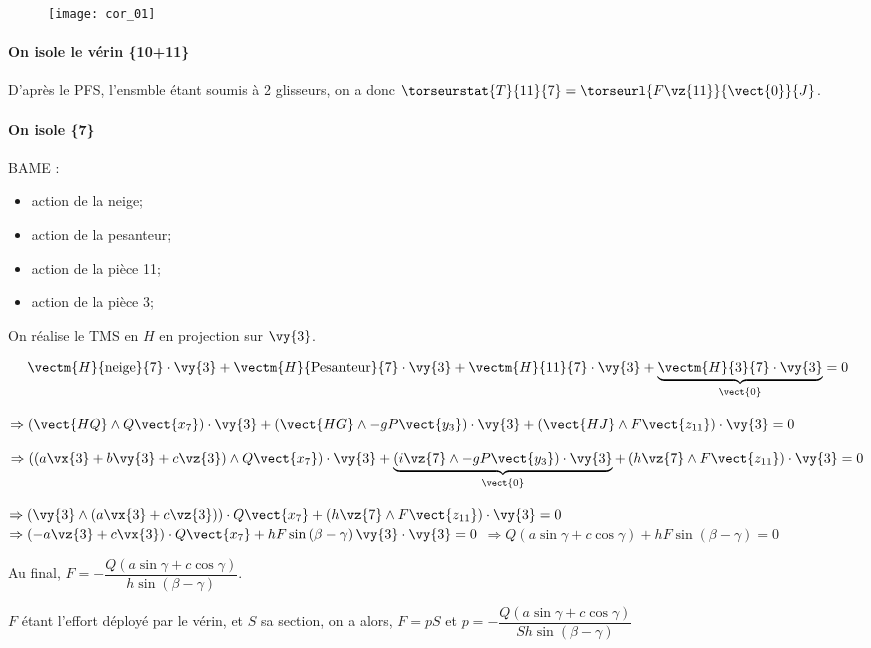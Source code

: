\begin{figure*}[!h]
\texttt{[image: cor\_01]}
\end{figure*}

\paragraph*{On isole le vérin \{10+11\}}
D'après le PFS, l'ensmble étant soumis à 2 glisseurs, on a donc $\torseurstat{T}{11}{7} = \torseurl{F\vz{11}}{\vect{0}}{J}$.

\paragraph*{On isole \{7\}}
BAME : 
\begin{itemize}
\item action de la neige;
\item action de la pesanteur;
\item action de la pièce 11;
\item action de la pièce 3;
\end{itemize}

On réalise le TMS en $H$ en projection sur $\vy{3}$.

$$
\vectm{H}{\text{neige}}{7} \cdot \vy{3} + \vectm{H}{\text{Pesanteur}}{7} \cdot \vy{3} + \vectm{H}{11}{7} \cdot \vy{3} + \underbrace{\vectm{H}{3}{7} \cdot \vy{3}}_{\vect{0}} =0
$$

$
\Rightarrow
\left(\vect{HQ}\wedge Q\vect{x_7} \right) \cdot \vy{3} 
+ \left(\vect{HG}\wedge -gP\vect{y_3} \right) \cdot \vy{3} 
+ \left(\vect{HJ}\wedge F\vect{z_{11}} \right)  \cdot \vy{3}=0
$

$
\Rightarrow
\left(\left(a\vx{3}+b\vy{3}+c\vz{3}\right)\wedge Q\vect{x_7} \right) \cdot \vy{3} 
+ \underbrace{\left( i\vz{7}\wedge -gP\vect{y_3} \right) \cdot \vy{3}}_{\vect{0}}
+ \left(h\vz{7}\wedge F\vect{z_{11}} \right)  \cdot \vy{3}=0
$

$
\Rightarrow
\left(\vy{3} \wedge \left(a\vx{3}+c\vz{3}\right)  \right) \cdot   Q\vect{x_7}
+ \left(h\vz{7}\wedge F\vect{z_{11}} \right)  \cdot \vy{3}=0
$
$
\Rightarrow
\left( -a\vz{3}+c\vx{3}\right)   \cdot   Q\vect{x_7}
+ hF \sin\left(\beta - \gamma\right)\vy{3}  \cdot \vy{3}=0
$
$
\Rightarrow
Q\left( a\sin \gamma+c\cos\gamma \right)  
+ hF \sin\left(\beta - \gamma\right)=0
$

Au final, $F= - \dfrac{Q\left( a\sin \gamma+c\cos\gamma \right)  }{ h \sin\left(\beta - \gamma\right)}$.

$F$ étant l'effort déployé par le vérin, et $S$ sa section, on a alors, $F=pS$ et 
$p= - \dfrac{Q\left( a\sin \gamma+c\cos\gamma \right)  }{S h \sin\left(\beta - \gamma\right)}$
\else
\fi